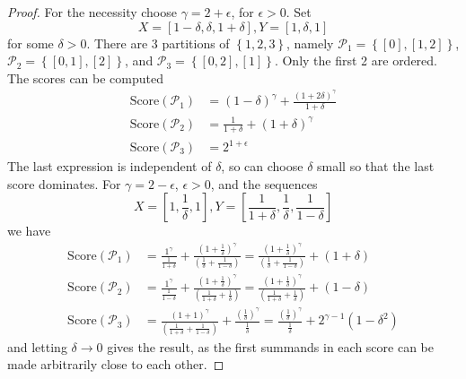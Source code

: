 \documentclass{article}
\theoremstyle{case}
\begin{document}
\begin{proof}
For the necessity choose $\gamma = 2 + \epsilon$, for $\epsilon > 0$. Set
\[
X = \left[ 1-\delta, \delta, 1 + \delta\right], Y = \left[ 1, \delta, 1\right]
\] 
for some $\delta > 0$. There are 3 partitions of $\left\lbrace 1, 2, 3\right\rbrace$, namely $\mathcal{P}_1 = \left\lbrace \left[ 0 \right], \left[ 1, 2\right]\right\rbrace$, $\mathcal{P}_2 = \left\lbrace \left[ 0, 1 \right], \left[ 2\right]\right\rbrace$, and $\mathcal{P}_3 = \left\lbrace \left[ 0, 2 \right], \left[ 1 \right]\right\rbrace$. Only the first 2 are ordered. The scores can be computed
\begin{align*}
\text{Score}\left(\mathcal{P}_1\right) & = \left( 1-\delta \right)^\gamma + \frac{\left( 1+2\delta\right)^\gamma}{1+\delta} \\
\text{Score}\left(\mathcal{P}_2\right) & = \frac{1}{1+\delta} + \left( 1+\delta\right)^\gamma \\
\text{Score}\left(\mathcal{P}_3\right) & = 2^{1+\epsilon}
\end{align*}
The last expression is independent of $\delta$, so can choose $\delta$ small so that the last score dominates.
For $\gamma = 2 - \epsilon$, $\epsilon > 0$, and the sequences
\[
X = \left[ 1, \frac{1}{\delta}, 1\right], Y = \left[ \frac{1}{1+\delta}, \frac{1}{\delta}, \frac{1}{1-\delta}\right]
\] 
we have
\begin{align*}
\text{Score}\left(\mathcal{P}_1\right) & = \frac{1^\gamma}{\frac{1}{1+\delta}} + \frac{\left(1 + \frac{1}{\delta}\right)^\gamma}{\left( \frac{1}{\delta} + \frac{1}{1 - \delta}\right) }  = \frac{\left(1 + \frac{1}{\delta}\right)^\gamma}{\left( \frac{1}{\delta} + \frac{1}{1 - \delta}\right) } + \left( 1 + \delta \right)\\
\text{Score}\left(\mathcal{P}_2\right) & = \frac{1^\gamma}{\frac{1}{1-\delta}} + \frac{\left( 1 + \frac{1}{\delta}\right)^\gamma}{\left( \frac{1}{1+\delta} + \frac{1}{\delta}\right)}  = \frac{\left( 1 + \frac{1}{\delta}\right)^\gamma}{\left( \frac{1}{1+\delta} + \frac{1}{\delta}\right)} + \left( 1 - \delta \right)\\
\text{Score}\left(\mathcal{P}_3\right) & = \frac{\left( 1 + 1\right)^\gamma}{\left(\frac{1}{1+\delta} + \frac{1}{1-\delta}\right)}  + \frac{\left( \frac{1}{\delta}\right)^\gamma}{\frac{1}{\delta}} = \frac{\left( \frac{1}{\delta}\right)^\gamma}{\frac{1}{\delta}} + 2^{\gamma - 1}\left( 1 - \delta^2\right) 
\end{align*}
and letting $\delta \rightarrow 0$ gives the result, as the first summands in each score can be made arbitrarily close to each other.


\end{proof}
\end{document}
